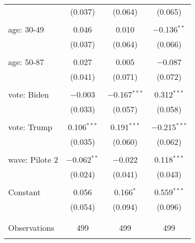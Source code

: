 \begin{tabular}{@{\extracolsep{5pt}}lccc}
  & (0.037) & (0.064) & (0.065) \\ 
  & & & \\ 
 age: 30-49 & 0.046 & 0.010 & $-$0.136$^{**}$ \\ 
  & (0.037) & (0.064) & (0.066) \\ 
  & & & \\ 
 age: 50-87 & 0.027 & 0.005 & $-$0.087 \\ 
  & (0.041) & (0.071) & (0.072) \\ 
  & & & \\ 
 vote: Biden & $-$0.003 & $-$0.167$^{***}$ & 0.312$^{***}$ \\ 
  & (0.033) & (0.057) & (0.058) \\ 
  & & & \\ 
 vote: Trump & 0.106$^{***}$ & 0.191$^{***}$ & $-$0.215$^{***}$ \\ 
  & (0.035) & (0.060) & (0.062) \\ 
  & & & \\ 
 wave: Pilote 2 & $-$0.062$^{**}$ & $-$0.022 & 0.118$^{***}$ \\ 
  & (0.024) & (0.041) & (0.043) \\ 
  & & & \\ 
 Constant & 0.056 & 0.166$^{*}$ & 0.559$^{***}$ \\ 
  & (0.054) & (0.094) & (0.096) \\ 
  & & & \\ 
\hline \\[-1.8ex] 

Observations & 499 & 499 & 499 \\ 
\hline 
\hline \\[-1.8ex] 
\end{tabular} 